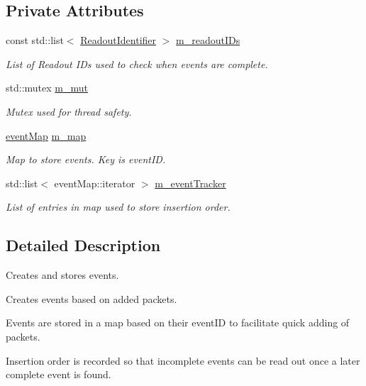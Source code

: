 \subsection*{Private Attributes}
\begin{DoxyCompactItemize}
\item 
const std\+::list$<$ \hyperlink{class_readout_identifier}{Readout\+Identifier} $>$ \hyperlink{class_thread_safe_event_map_a1b1ff8e56effaac464b1c9dbfb44320c}{m\+\_\+readout\+I\+Ds}
\begin{DoxyCompactList}\small\item\em List of Readout I\+Ds used to check when events are complete. \end{DoxyCompactList}\item 
std\+::mutex \hyperlink{class_thread_safe_event_map_ada4e8c2f2195df86503e73674ff30935}{m\+\_\+mut}
\begin{DoxyCompactList}\small\item\em Mutex used for thread safety. \end{DoxyCompactList}\item 
\hyperlink{class_thread_safe_event_map_a069c80cec7636a015d8a69574157d8d2}{event\+Map} \hyperlink{class_thread_safe_event_map_a15d9d8928ff7dc51fa48a1829575b47e}{m\+\_\+map}
\begin{DoxyCompactList}\small\item\em Map to store events. Key is event\+ID. \end{DoxyCompactList}\item 
std\+::list$<$ event\+Map\+::iterator $>$ \hyperlink{class_thread_safe_event_map_abfd8bf29e9ff254df217bd2b9e32f50c}{m\+\_\+event\+Tracker}
\begin{DoxyCompactList}\small\item\em List of entries in map used to store insertion order. \end{DoxyCompactList}\end{DoxyCompactItemize}


\subsection{Detailed Description}
Creates and stores events. 

Creates events based on added packets.

Events are stored in a map based on their event\+ID to facilitate quick adding of packets.

Insertion order is recorded so that incomplete events can be read out once a later complete event is found. 

